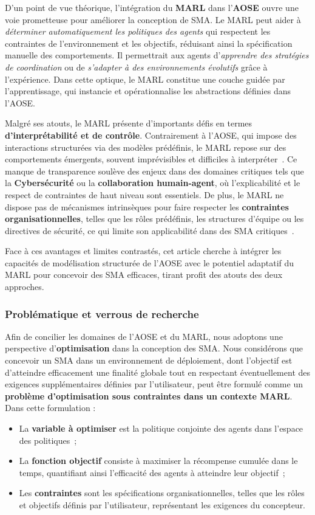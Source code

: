 D'un point de vue théorique, l'intégration du \textbf{MARL} dans l'\textbf{AOSE} ouvre une voie prometteuse pour améliorer la conception de SMA. Le MARL peut aider à \textit{déterminer automatiquement les politiques des agents} qui respectent les contraintes de l'environnement et les objectifs, réduisant ainsi la spécification manuelle des comportements. Il permettrait aux agents d'\textit{apprendre des stratégies de coordination} ou de \textit{s'adapter à des environnements évolutifs} grâce à l'expérience. Dans cette optique, le MARL constitue une couche guidée par l'apprentissage, qui instancie et opérationnalise les abstractions définies dans l'AOSE.

Malgré ses atouts, le MARL présente d'importants défis en termes \textbf{d'interprétabilité et de contrôle}. Contrairement à l'AOSE, qui impose des interactions structurées via des modèles prédéfinis, le MARL repose sur des comportements émergents, souvent imprévisibles et difficiles à interpréter~\cite{Du2022}. Ce manque de transparence soulève des enjeux dans des domaines critiques tels que la \textbf{Cybersécurité} ou la \textbf{collaboration humain-agent}, où l'explicabilité et le respect de contraintes de haut niveau sont essentiels. De plus, le MARL ne dispose pas de mécanismes intrinsèques pour faire respecter les \textbf{contraintes organisationnelles}, telles que les rôles prédéfinis, les structures d'équipe ou les directives de sécurité, ce qui limite son applicabilité dans des SMA critiques~\cite{Nguyen2020}.

Face à ces avantages et limites contrastés, cet article cherche à intégrer les capacités de modélisation structurée de l'AOSE avec le potentiel adaptatif du MARL pour concevoir des SMA efficaces, tirant profit des atouts des deux approches.

\subsubsection{Problématique et verrous de recherche}

Afin de concilier les domaines de l'AOSE et du MARL, nous adoptons une perspective d'\textbf{optimisation} dans la conception des SMA. Nous considérons que concevoir un SMA dans un environnement de déploiement, dont l'objectif est d'atteindre efficacement une finalité globale tout en respectant éventuellement des exigences supplémentaires définies par l'utilisateur, peut être formulé comme un \textbf{problème d'optimisation sous contraintes dans un contexte MARL}. Dans cette formulation :
\begin{itemize}
    \item La \textbf{variable à optimiser} est la politique conjointe des agents dans l'espace des politiques~;
    \item La \textbf{fonction objectif} consiste à maximiser la récompense cumulée dans le temps, quantifiant ainsi l'efficacité des agents à atteindre leur objectif~;
    \item Les \textbf{contraintes} sont les spécifications organisationnelles, telles que les rôles et objectifs définis par l'utilisateur, représentant les exigences du concepteur.
\end{itemize}

